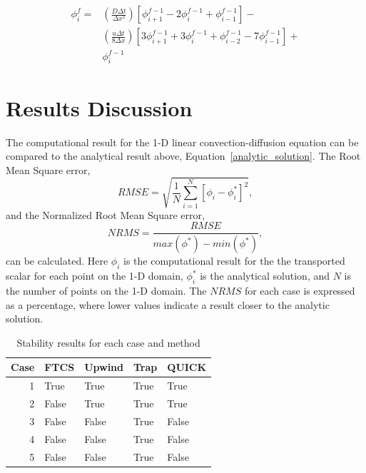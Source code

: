 \documentclass[twocolumn,10pt]{asme2ej}
\begin{document}
\begin{equation}
\label{quick_eqn}
\begin{split}
\phi_i ^f = & \left( \frac{D \Delta t}{\Delta x^2} \right) \left[ \phi_{i+1} ^{f-1} - 2 \phi_{i} ^{f-1} + \phi_{i-1} ^{f-1} \right] - \\
            & \left( \frac{u \Delta t}{8 \Delta x} \right) \left[ 3 \phi_{i+1} ^{f-1}  + 3 \phi_{i} ^{f-1}  + \phi_{i-2} ^{f-1} - 7 \phi_{i-1} ^{f-1} \right] + \\
            & \phi_i ^{f-1}
\end{split}
\end{equation}

\section{Results Discussion}

The computational result for the 1-D linear convection-diffusion equation can be compared to the analytical result above, Equation~\ref{analytic_solution}. The Root Mean Square error,
\begin{equation}
RMSE = \sqrt{\frac{1}{N}\sum\limits_{i=1}^N[\phi_i - \phi^*_i]^2},
\end{equation}
and the Normalized Root Mean Square error,
\begin{equation}
NRMS = \dfrac{RMSE}{max(\phi^*)-min(\phi^*)},
\end{equation}
can be calculated. Here $\phi_i$ is the computational result for the the transported scalar for each point on the 1-D domain, $\phi^*_i$ is the analytical solution, and $N$ is the number of points on the 1-D domain. The $NRMS$ for each case is expressed as a percentage, where lower values indicate a result closer to the analytic solution.

\begin{table}[htb]
\begin{center}
\begin{tabular}{|r | l l l l|}
\hline
Case & FTCS & Upwind & Trap & QUICK  \\
\hline
1 & True  & True  & True & True  \\
2 & False & True  & True & True  \\
3 & False & False & True & False \\
4 & False & False & True & False \\
5 & False & False & True & False \\
\hline
\end{tabular}
\caption{Stability results for each case and method}
\label{stability_table}
\end{center}
\end{table}
\end{document}
